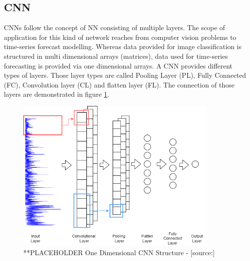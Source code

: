 \subsection{CNN}
\label{sec:cnn}
CNNs follow the concept of NN consisting of multiple layers. The scope of application for this kind of network reaches from computer vision problems to time-series forecast modelling. Whereas data provided for image classification is structured in multi dimensional arrays (matrices), data used for time-series forecasting is provided via one dimensional arrays.\cite{cnn_intro} A CNN provides different types of layers. Those layer types are called Pooling Layer (PL), Fully Connected (FC), Convolution layer (CL) and flatten layer (FL). The connection of those layers are demonstrated in figure \ref{fig:cnn_struct}.
\begin{figure}[H]
	\centering
		\includegraphics[width=10cm]{images/1d_cnn_model}
	\caption{**PLACEHOLDER One Dimensional CNN Structure - [source:\cite{cnn_vechicle}]}
	\label{fig:cnn_struct}
\end{figure}

